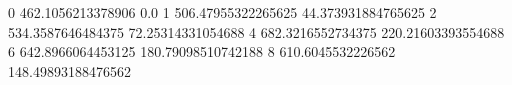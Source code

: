 0 462.1056213378906 0.0
1 506.47955322265625 44.373931884765625
2 534.3587646484375 72.25314331054688
4 682.3216552734375 220.21603393554688
6 642.8966064453125 180.79098510742188
8 610.6045532226562 148.49893188476562
